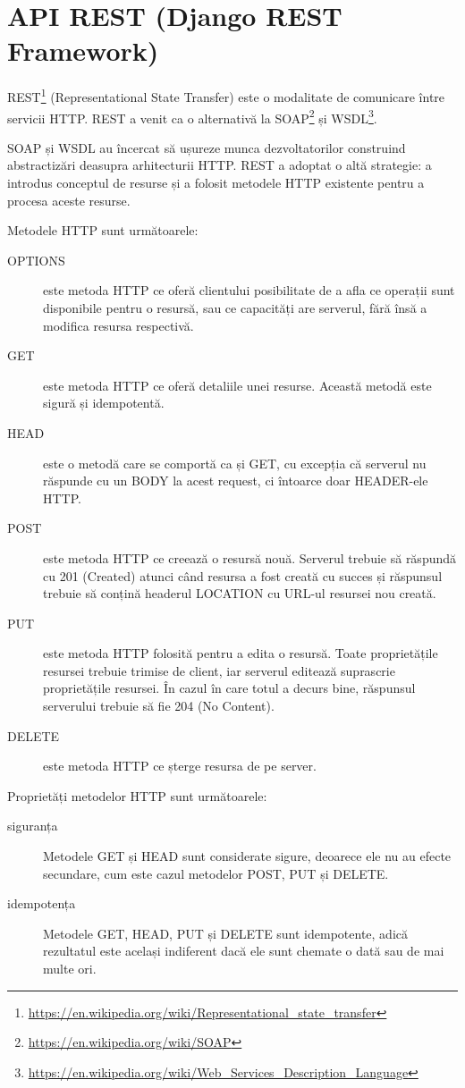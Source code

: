 \section{API REST (Django REST Framework)}

REST\footnote{\url{https://en.wikipedia.org/wiki/Representational_state_transfer}} (Representational State Transfer)
este o modalitate
de comunicare între servicii HTTP. REST a venit ca o alternativă
la SOAP\footnote{\url{https://en.wikipedia.org/wiki/SOAP}} și 
WSDL\footnote{\url{https://en.wikipedia.org/wiki/Web\_Services\_Description\_Language}}. 

SOAP și WSDL au încercat să ușureze munca dezvoltatorilor 
construind abstractizări deasupra
arhitecturii HTTP. REST a adoptat o altă strategie:
a introdus conceptul de resurse și a folosit
metodele HTTP existente pentru a procesa aceste resurse.

Metodele HTTP sunt următoarele:
\begin{description}
\item [OPTIONS] este metoda HTTP ce oferă clientului
posibilitate de a afla ce operații sunt disponibile
pentru o resursă, sau ce capacități are serverul,
fără însă a modifica resursa respectivă.
\item [GET] este metoda HTTP ce oferă detaliile unei resurse.
Această metodă este sigură și idempotentă.
\item [HEAD] este o metodă care se comportă ca și GET, cu 
excepția că serverul nu răspunde cu un BODY la acest request,
ci întoarce doar HEADER-ele HTTP.
\item [POST] este metoda HTTP ce creează o resursă nouă.
Serverul trebuie să răspundă cu 201 (Created) atunci când resursa
a fost creată cu succes și răspunsul trebuie să conțină
headerul LOCATION cu URL-ul resursei nou creată.
\item [PUT] este metoda HTTP folosită pentru a edita
o resursă. Toate proprietățile resursei trebuie trimise
de client, iar serverul editează suprascrie proprietățile resursei.
În cazul în care totul a decurs bine, răspunsul serverului
trebuie să fie 204 (No Content).
\item [DELETE] este metoda HTTP ce șterge resursa de pe server.
\end{description}

Proprietăți metodelor HTTP sunt următoarele:
\begin{description}
\item [siguranța] Metodele GET și HEAD sunt considerate
sigure, deoarece ele nu au efecte secundare, cum este cazul
metodelor POST, PUT și DELETE.
\item [idempotența] Metodele GET, HEAD, PUT și DELETE sunt
idempotente, adică rezultatul este același indiferent
dacă ele sunt chemate o dată sau de mai multe ori.
\end{description}

